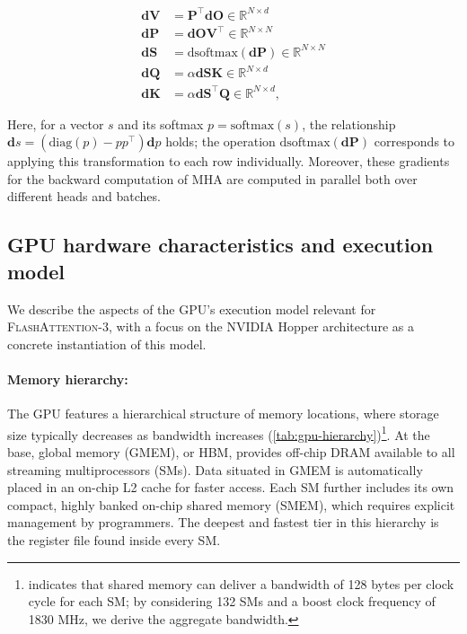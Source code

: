 \begin{enumerate}
\begin{align*}
  \mathbf{dV} &= \mathbf{P}^\top \mathbf{dO} \in \mathbb{R}^{N \times d} \\
  \mathbf{dP} &= \mathbf{dO} \mathbf{V}^\top \in \mathbb{R}^{N \times N} \\
  \mathbf{dS} &= \mathrm{dsoftmax} (\mathbf{dP}) \in \mathbb{R}^{N \times N} \\
  \mathbf{dQ} &= \alpha \mathbf{dS} \mathbf{K} \in \mathbb{R}^{N \times d} \\
  \mathbf{dK} &= \alpha \mathbf{dS}^\top \mathbf{Q} \in \mathbb{R}^{N \times d},
\end{align*}

Here, for a vector $s$ and its softmax $p = \mathrm{softmax}(s)$, the relationship $\mathbf{d}s = (\mathrm{diag}(p) - p p^\top)\mathbf{d}p$ holds; the operation $\mathrm{dsoftmax}(\mathbf{dP})$ corresponds to applying this transformation to each row individually. Moreover, these gradients for the backward computation of MHA are computed in parallel both over different heads and batches.

\subsection{GPU hardware characteristics and execution model}
\label{subsec:hardware}

We describe the aspects of the GPU's execution model relevant for \textsc{FlashAttention-3}, with a focus on the NVIDIA Hopper architecture as a concrete instantiation of this model.

\paragraph{Memory hierarchy:} The GPU features a hierarchical structure of memory locations, where storage size typically decreases as bandwidth increases (\cref{tab:gpu-hierarchy})\footnote{\citet{luo2024benchmarking} indicates that shared memory can deliver a bandwidth of 128 bytes per clock cycle for each SM; by considering 132 SMs and a boost clock frequency of 1830 MHz, we derive the aggregate bandwidth.}. At the base, global memory (GMEM), or HBM, provides off-chip DRAM available to all streaming multiprocessors (SMs). Data situated in GMEM is automatically placed in an on-chip L2 cache for faster access. Each SM further includes its own compact, highly banked on-chip shared memory (SMEM), which requires explicit management by programmers. The deepest and fastest tier in this hierarchy is the register file found inside every SM.


\end{enumerate}
